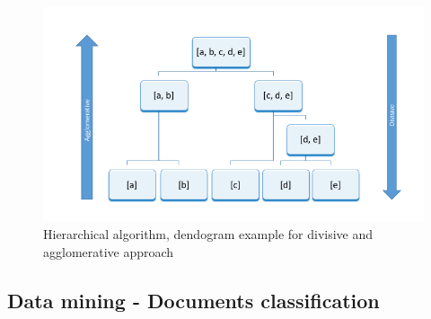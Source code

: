 	\begin{figure}[H]
	\begin{center}
	\includegraphics[width=1.0\linewidth]{images/hierarchical.png}
	\caption{Hierarchical algorithm, dendogram example for divisive and agglomerative approach}
	\label{hierarchical_dendogram}
	\end{center}
	\end{figure}

\subsection{Data mining - Documents classification}

